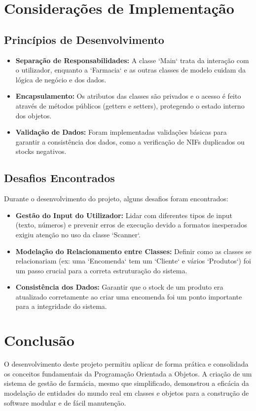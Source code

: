 \documentclass[a4paper,12pt]{article}
\begin{document}
\section{Considerações de Implementação}

\subsection{Princípios de Desenvolvimento}
\begin{itemize}
    \item \textbf{Separação de Responsabilidades:} A classe `Main` trata da interação com o utilizador, enquanto a `Farmacia` e as outras classes de modelo cuidam da lógica de negócio e dos dados.
    \item \textbf{Encapsulamento:} Os atributos das classes são privados e o acesso é feito através de métodos públicos (getters e setters), protegendo o estado interno dos objetos.
    \item \textbf{Validação de Dados:} Foram implementadas validações básicas para garantir a consistência dos dados, como a verificação de NIFs duplicados ou stocks negativos.
\end{itemize}

\subsection{Desafios Encontrados}
Durante o desenvolvimento do projeto, alguns desafios foram encontrados:
\begin{itemize}
    \item \textbf{Gestão do Input do Utilizador:} Lidar com diferentes tipos de input (texto, números) e prevenir erros de execução devido a formatos inesperados exigiu atenção no uso da classe `Scanner`.
    \item \textbf{Modelação do Relacionamento entre Classes:} Definir como as classes se relacionariam (ex: uma `Encomenda` tem um `Cliente` e vários `Produtos`) foi um passo crucial para a correta estruturação do sistema.
    \item \textbf{Consistência dos Dados:} Garantir que o stock de um produto era atualizado corretamente ao criar uma encomenda foi um ponto importante para a integridade do sistema.
\end{itemize}

\section{Conclusão}
O desenvolvimento deste projeto permitiu aplicar de forma prática e consolidada os conceitos fundamentais da Programação Orientada a Objetos. A criação de um sistema de gestão de farmácia, mesmo que simplificado, demonstrou a eficácia da modelação de entidades do mundo real em classes e objetos para a construção de software modular e de fácil manutenção.
\end{document}
